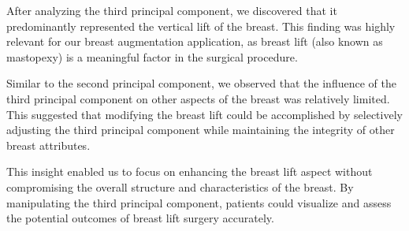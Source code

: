 After analyzing the third principal component, we discovered that it predominantly represented the vertical lift of the breast. This finding was highly relevant for our breast augmentation application, 
as breast lift (also known as mastopexy) is a meaningful factor in the surgical procedure.

Similar to the second principal component, we observed that the influence of the third principal component on other aspects of the breast was relatively limited. 
This suggested that modifying the breast lift could be accomplished by selectively adjusting the third principal component while maintaining the integrity of other breast attributes.

This insight enabled us to focus on enhancing the breast lift aspect without compromising the overall structure and characteristics of the breast. By manipulating the third principal component, 
patients could visualize and assess the potential outcomes of breast lift surgery accurately.

